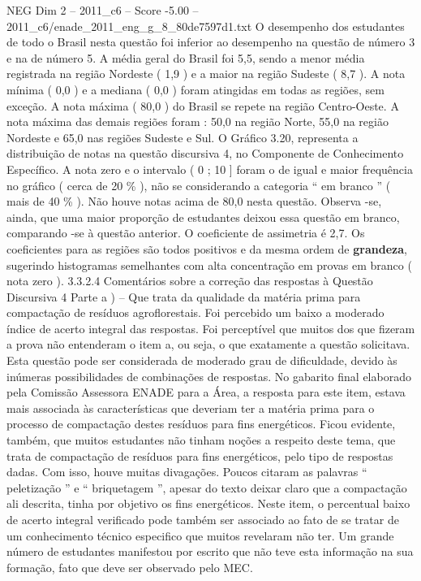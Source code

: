 \begin{textsample}{NEG Dim 2 – 2011\_c6 – Score -5.00 – 2011\_c6/enade\_2011\_eng\_g\_8\_80de7597d1.txt}
O desempenho dos estudantes de todo o Brasil nesta questão foi inferior ao desempenho na questão de número 3 e na de número 5.
A média geral do Brasil foi 5,5, sendo a menor média registrada na região Nordeste ( 1,9 ) e a maior na região Sudeste ( 8,7 ).
A nota mínima ( 0,0 ) e a mediana ( 0,0 ) foram atingidas em todas as regiões, sem exceção.
A nota máxima ( 80,0 ) do Brasil se repete na região Centro-Oeste.
A nota máxima das demais regiões foram : 50,0 na região Norte, 55,0 na região Nordeste e 65,0 nas regiões Sudeste e Sul.
O Gráfico 3.20, representa a distribuição de notas na questão discursiva 4, no Componente de Conhecimento Específico.
A nota zero e o intervalo ( 0 ; 10 ] foram o de igual e maior frequência no gráfico ( cerca de 20 \% ), não se considerando a categoria “ em branco ” ( mais de 40 \% ).
Não houve notas acima de 80,0 nesta questão.
Observa -se, ainda, que uma maior proporção de estudantes deixou essa questão em branco, comparando -se à questão anterior.
O coeficiente de assimetria é 2,7.
Os coeficientes para as regiões são todos positivos e da mesma ordem de \textbf{grandeza}, sugerindo histogramas semelhantes com alta concentração em provas em branco ( nota zero ). 3.3.2.4 Comentários sobre a correção das respostas à Questão Discursiva 4 Parte a ) – Que trata da qualidade da matéria prima para compactação de resíduos agroflorestais.
Foi percebido um baixo a moderado índice de acerto integral das respostas.
Foi perceptível que muitos dos que fizeram a prova não entenderam o item a, ou seja, o que exatamente a questão solicitava.
Esta questão pode ser considerada de moderado grau de dificuldade, devido às inúmeras possibilidades de combinações de respostas.
No gabarito final elaborado pela Comissão Assessora ENADE para a Área, a resposta para este item, estava mais associada às características que deveriam ter a matéria prima para o processo de compactação destes resíduos para fins energéticos.
Ficou evidente, também, que muitos estudantes não tinham noções a respeito deste tema, que trata de compactação de resíduos para fins energéticos, pelo tipo de respostas dadas.
Com isso, houve muitas divagações.
Poucos citaram as palavras “ peletização ” e “ briquetagem ”, apesar do texto deixar claro que a compactação ali descrita, tinha por objetivo os fins energéticos.
Neste item, o percentual baixo de acerto integral verificado pode também ser associado ao fato de se tratar de um conhecimento técnico especifico que muitos revelaram não ter.
Um grande número de estudantes manifestou por escrito que não teve esta informação na sua formação, fato que deve ser observado pelo MEC.

\end{textsample}
